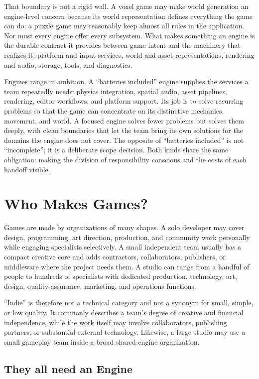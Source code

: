 \documentclass[
  11pt,
  letterpaper,
  DIV=11,
  numbers=noendperiod,
  twoside,
  open=right]{scrreprt}
\begin{document}
That boundary is not a rigid wall. A voxel game may make world
generation an engine-level concern because its world representation
defines everything the game can do; a puzzle game may reasonably keep
almost all rules in the application. Nor must every engine offer every
subsystem. What makes something an engine is the durable contract it
provides between game intent and the machinery that realizes it:
platform and input services, world and asset representations, rendering
and audio, storage, tools, and diagnostics.

Engines range in ambition. A ``batteries included'' engine supplies the
services a team repeatedly needs: physics integration, spatial audio,
asset pipelines, rendering, editor workflows, and platform support. Its
job is to solve recurring problems so that the game can concentrate on
its distinctive mechanics, movement, and world. A focused engine solves
fewer problems but solves them deeply, with clean boundaries that let
the team bring its own solutions for the domains the engine does not
cover. The opposite of ``batteries included'' is not ``incomplete''; it
is a deliberate scope decision. Both kinds share the same obligation:
making the division of responsibility conscious and the costs of each
handoff visible.

\section{Who Makes Games?}\label{who-makes-games}

Games are made by organizations of many shapes. A solo developer may
cover design, programming, art direction, production, and community work
personally while engaging specialists selectively. A small independent
team usually has a compact creative core and adds contractors,
collaborators, publishers, or middleware where the project needs them. A
studio can range from a handful of people to hundreds of specialists
with dedicated production, technology, art, design, quality-assurance,
marketing, and operations functions.

``Indie'' is therefore not a technical category and not a synonym for
small, simple, or low quality. It commonly describes a team's degree of
creative and financial independence, while the work itself may involve
collaborators, publishing partners, or substantial external technology.
Likewise, a large studio may use a small gameplay team inside a broad
shared-engine organization.

\subsection{They all need an Engine}\label{they-all-need-an-engine}
\end{document}
